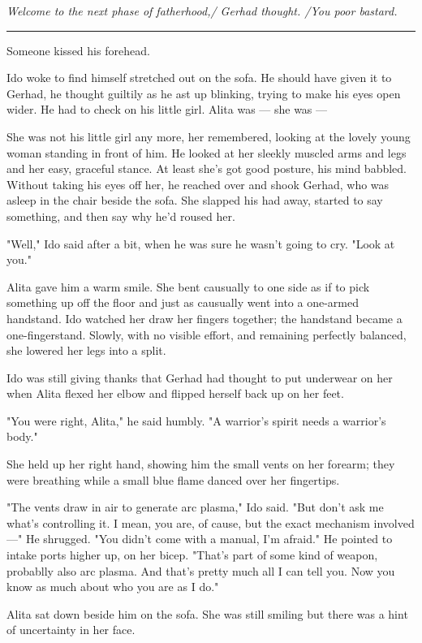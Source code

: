 \documentclass[11pt]{article}
\begin{document}
\emph{Welcome to the next phase of fatherhood,/ Gerhad thought. /You poor bastard.}




\rule{\linewidth}{0.5pt}




Someone kissed his forehead.

Ido woke to find himself stretched out on the sofa. He should have given it to Gerhad, he thought guiltily as he ast up blinking, trying to make his eyes open wider. He had to check on his little girl. Alita was --- she was ---

She was not his little girl any more, her remembered, looking at the lovely young woman standing in front of him. He looked at her sleekly muscled arms and legs and her easy, graceful stance. At least she's got good posture, his mind babbled. Without taking his eyes off her, he reached over and shook Gerhad, who was asleep in the chair beside the sofa. She slapped his had away, started to say something, and then say why he'd roused her.

"Well," Ido said after a bit, when he was sure he wasn't going to cry. "Look at you."

Alita gave him a warm smile. She bent causually to one side as if to pick something up off the floor and just as causually went into a one-armed handstand. Ido watched her draw her fingers together; the handstand became a one-fingerstand. Slowly, with no visible effort, and remaining perfectly balanced, she lowered her legs into a split.

Ido was still giving thanks that Gerhad had thought to put underwear on her when Alita flexed her elbow and flipped herself back up on her feet.

"You were right, Alita," he said humbly. "A warrior's spirit needs a warrior's body."

She held up her right hand, showing him the small vents on her forearm; they were breathing while a small blue flame danced over her fingertips.

"The vents draw in air to generate arc plasma," Ido said. "But don't ask me what's controlling it. I mean, you are, of cause, but the exact mechanism involved ---" He shrugged. "You didn't come with a manual, I'm afraid." He pointed to intake ports higher up, on her bicep. "That's part of some kind of weapon, probablly also arc plasma. And that's pretty much all I can tell you. Now you know as much about who you are as I do."

Alita sat down beside him on the sofa. She was still smiling but there was a hint of uncertainty in her face.
\end{document}
